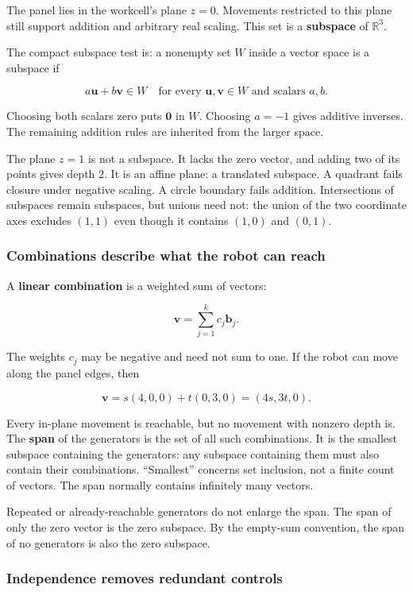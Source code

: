 The panel lies in the workcell's plane \(z=0\). Movements restricted to this plane still support addition and arbitrary real scaling. This set is a \textbf{subspace} of \(\mathbb R^3\).

The compact subspace test is: a nonempty set \(W\) inside a vector space is a subspace if

\[
a\mathbf u+b\mathbf v\in W
\quad\text{for every }\mathbf u,\mathbf v\in W
\text{ and scalars }a,b.
\]

Choosing both scalars zero puts \(\mathbf0\) in \(W\). Choosing \(a=-1\) gives additive inverses. The remaining addition rules are inherited from the larger space.

The plane \(z=1\) is not a subspace. It lacks the zero vector, and adding two of its points gives depth \(2\). It is an affine plane: a translated subspace. A quadrant fails closure under negative scaling. A circle boundary fails addition. Intersections of subspaces remain subspaces, but unions need not: the union of the two coordinate axes excludes \((1,1)\) even though it contains \((1,0)\) and \((0,1)\).

\subsubsection{Combinations describe what the robot can reach}\label{combinations-describe-what-the-robot-can-reach}

A \textbf{linear combination} is a weighted sum of vectors:

\[
\mathbf v=\sum_{j=1}^{k}c_j\mathbf b_j.
\]

The weights \(c_j\) may be negative and need not sum to one. If the robot can move along the panel edges, then

\[
\mathbf v=s(4,0,0)+t(0,3,0)=(4s,3t,0).
\]

Every in-plane movement is reachable, but no movement with nonzero depth is. The \textbf{span} of the generators is the set of all such combinations. It is the smallest subspace containing the generators: any subspace containing them must also contain their combinations. ``Smallest'' concerns set inclusion, not a finite count of vectors. The span normally contains infinitely many vectors.

Repeated or already-reachable generators do not enlarge the span. The span of only the zero vector is the zero subspace. By the empty-sum convention, the span of no generators is also the zero subspace.

\subsubsection{Independence removes redundant controls}\label{independence-removes-redundant-controls}

